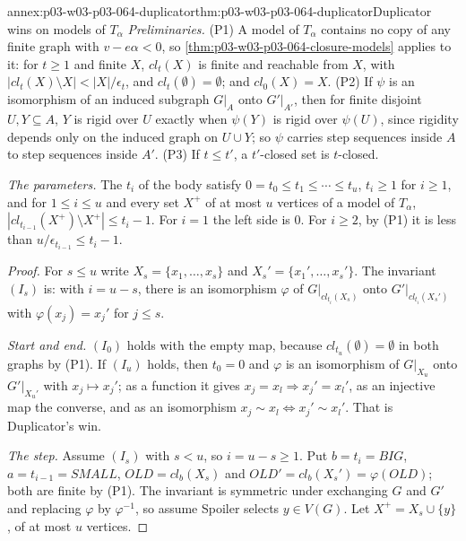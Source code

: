 \begin{annexitem}{annex:p03-w03-p03-064-duplicator}{thm:p03-w03-p03-064-duplicator}{Duplicator wins on models of \(T_\alpha\)}
\emph{Preliminaries.}  (P1) A model of \(T_\alpha\) contains no copy of any
finite graph with \(v-e\alpha<0\), so
\cref{thm:p03-w03-p03-064-closure-models} applies to it: for \(t\geq1\) and
finite \(X\), \(cl_t(X)\) is finite and reachable from \(X\), with
\(|cl_t(X)\setminus X|<|X|/\epsilon_t\), and \(cl_t(\emptyset)=\emptyset\);
and \(cl_0(X)=X\).  (P2) If \(\psi\) is an isomorphism of an induced subgraph
\(G|_A\) onto \(G'|_{A'}\), then for finite disjoint \(U,Y\subseteq A\), \(Y\)
is rigid over \(U\) exactly when \(\psi(Y)\) is rigid over \(\psi(U)\), since
rigidity depends only on the induced graph on \(U\cup Y\); so \(\psi\) carries
step sequences inside \(A\) to step sequences inside \(A'\).  (P3) If
\(t\leq t'\), a \(t'\)-closed set is \(t\)-closed.

\emph{The parameters.}  The \(t_i\) of the body satisfy
\(0=t_0\leq t_1\leq\cdots\leq t_u\), \(t_i\geq1\) for \(i\geq1\), and for
\(1\leq i\leq u\) and every set \(X^+\) of at most \(u\) vertices of a model
of \(T_\alpha\),
\(|cl_{t_{i-1}}(X^+)\setminus X^+|\leq t_i-1\).  For \(i=1\) the left side is
\(0\).  For \(i\geq2\), by (P1) it is less than
\(u/\epsilon_{t_{i-1}}\leq t_i-1\).

\begin{proof}
For \(s\leq u\) write \(X_s=\{x_1,\ldots,x_s\}\) and
\(X_s'=\{x_1',\ldots,x_s'\}\).  The invariant \((I_s)\) is: with \(i=u-s\),
there is an isomorphism \(\varphi\) of \(G|_{cl_{t_i}(X_s)}\) onto
\(G'|_{cl_{t_i}(X_s')}\) with \(\varphi(x_j)=x_j'\) for \(j\leq s\).

\emph{Start and end.}  \((I_0)\) holds with the empty map, because
\(cl_{t_u}(\emptyset)=\emptyset\) in both graphs by (P1).  If \((I_u)\) holds,
then \(t_0=0\) and \(\varphi\) is an isomorphism of \(G|_{X_u}\) onto
\(G'|_{X_u'}\) with \(x_j\mapsto x_j'\); as a function it gives
\(x_j=x_l\Rightarrow x_j'=x_l'\), as an injective map the converse, and as an
isomorphism \(x_j\sim x_l\iff x_j'\sim x_l'\).  That is Duplicator's win.

\emph{The step.}  Assume \((I_s)\) with \(s<u\), so \(i=u-s\geq1\).  Put
\(b=t_i=\mathit{BIG}\), \(a=t_{i-1}=\mathit{SMALL}\),
\(\mathit{OLD}=cl_b(X_s)\) and \(\mathit{OLD}'=cl_b(X_s')=\varphi(\mathit{OLD})\);
both are finite by (P1).  The invariant is symmetric under exchanging \(G\)
and \(G'\) and replacing \(\varphi\) by \(\varphi^{-1}\), so assume Spoiler
selects \(y\in V(G)\).  Let \(X^+=X_s\cup\{y\}\), of at most \(u\) vertices.


\end{proof}
\end{annexitem}
